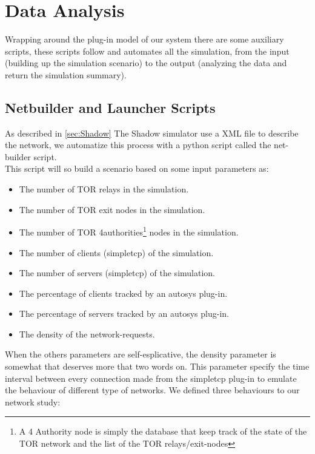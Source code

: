 \section{Data Analysis}
Wrapping around the plug-in model of our system there are some auxiliary scripts,
these scripts follow and automates all the simulation, from the input (building up
the simulation scenario) to the output (analyzing the data and return the simulation
summary).

\subsection{Netbuilder and Launcher Scripts}
As described in \ref{sec:Shadow}
The Shadow simulator use a XML file to describe the network,
we automatize this process with a python script called the net-builder script.\\
This script will so build a scenario based on some input parameters as:
\begin{itemize}
\item The number of TOR relays in the simulation.
\item The number of TOR exit nodes in the simulation.
\item The number of TOR 4authorities\footnote{A 4 Authority node is simply the
database that keep track of the state of the TOR network and the list
of the TOR relays/exit-nodes} nodes in the simulation.
\item The number of clients (simpletcp) of the simulation.
\item The number of servers (simpletcp) of the simulation.
\item The percentage of clients tracked by an autosys plug-in.
\item The percentage of servers tracked by an autosys plug-in.
\item The density of the network-requests.
\end{itemize}

When the others parameters are self-esplicative, the density parameter is somewhat
that deserves more that two words on.
This parameter specify the time interval between every connection made from the
simpletcp plug-in to emulate the behaviour of different type of networks.
We defined three behaviours to our network study:

